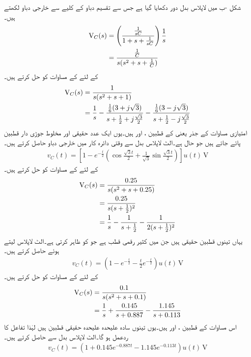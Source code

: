 شکل -ب میں لاپلاس بدل دور دکھایا گیا ہے جس سے تقسیم دباو کے کلیے سے خارجی دباو لکھتے ہیں۔
\begin{align*}
{\ensuremath{{\textup{V}}}}_C(s)&=\left(\frac{\frac{1}{sC}}{1+s+\frac{1}{sC}}\right)\frac{1}{s}\\
&=\frac{\frac{1}{C}}{s(s^2+s+\frac{1}{C})}
\end{align*}
  کے لئے  کے مساوات کو حل کرتے ہیں۔
\begin{align*}
{\ensuremath{{\textup{V}}}}_C(s)&=\frac{1}{s(s^2+s+1)}\\
&=\frac{1}{s}-\frac{\frac{1}{6}(3+j\sqrt{3})}{s+\frac{1}{2}+j\frac{\sqrt{3}}{2}}-\frac{\frac{1}{6}(3-j\sqrt{3})}{s+\frac{1}{2}-j\frac{\sqrt{3}}{2}}
\end{align*}
امتیازی مساوات کے جذر یعنی  کے قطبین ،  اور
  ہیں۔یوں ایک عدد حقیقی اور مخلوط جوڑی دار قطبین پائے جاتے ہیں جو  حال ہے۔الٹ لاپلاس بدل سے وقتی دائرہ کار میں خارجی دباو حاصل کرتے ہیں۔
\begin{align*}
v_C(t)=\left[1-e^{-\frac{t}{2}}\left(\cos \frac{\sqrt{3}t}{2}+\frac{1}{\sqrt{3}}\sin\frac{\sqrt{3}t}{2}\right)\right]u(t)\,\si{\volt}
\end{align*}
  کے لئے  کے مساوات کو حل کرتے ہیں۔
\begin{align*}
{\ensuremath{{\textup{V}}}}_C(s)&=\frac{0.25}{s(s^2+s+0.25)}\\
&=\frac{0.25}{s(s+\frac{1}{2})^2}\\
&=\frac{1}{s}-\frac{1}{s+\frac{1}{2}}-\frac{1}{2(s+\frac{1}{2})^2}
\end{align*}
یہاں تینوں قطبین حقیقی ہیں جن میں  کثیر رقمی قطب ہے جو  کو ظاہر کرتی ہے۔الٹ لاپلاس لیتے ہوئے  حاصل  کرتے ہیں۔
\begin{align*}
v_C(t)=\left(1-e^{-\frac{t}{2}}-\frac{t}{2}e^{-\frac{t}{2}}\right)u(t) \,\si{\volt}
\end{align*}
  کے لئے  کے مساوات کو حل کرتے ہیں۔
\begin{align*}
{\ensuremath{{\textup{V}}}}_C(s)&=\frac{0.1}{s(s^2+s+0.1)}\\
&=\frac{1}{s}+\frac{0.145}{s+0.887}-\frac{1.145}{s+0.113}
\end{align*}
اس مساوات کے قطبین ،  اور  ہیں۔یوں تینوں سادہ علیحدہ علیحدہ حقیقی قطبین ہیں لہٰذا تفاعل کا ردعمل  ہو گا۔الٹ لاپلاس بدل سے  حاصل کرتے ہیں۔
\begin{align*}
v_C(t)=\left(1+0.145e^{-0.887t}-1.145e^{-0.113t}\right)u(t)\,\si{\volt}
\end{align*}
